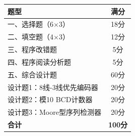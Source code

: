 \begin{table}[h]
\centering
\begin{tabular}{|l|c|}
\hline
\textbf{题型} & \textbf{满分} \\
\hline
一、选择题（6$\times$3） & 18分 \\
\hline
二、填空题（4$\times$3） & 12分 \\
\hline
三、程序改错题 & 5分 \\
\hline
四、程序阅读分析题 & 5分 \\
\hline
五、综合设计题 & 60分 \\
\quad 设计题1：8线-3线优先编码器 & 20分 \\
\quad 设计题2：模10 BCD计数器 & 20分 \\
\quad 设计题3：Moore型序列检测器 & 20分 \\
\hline
\textbf{合计} & \textbf{100分} \\
\hline
\end{tabular}
\end{table}

\endinput

